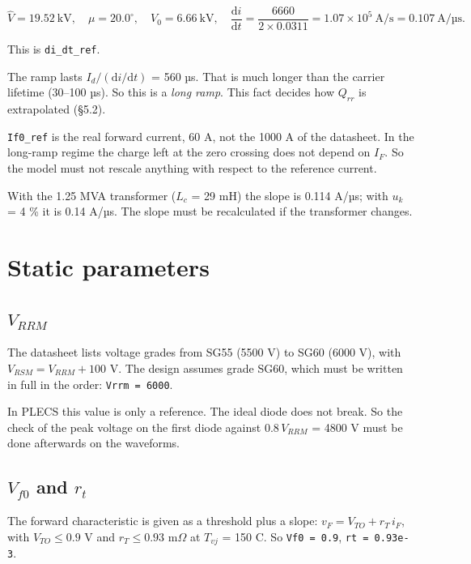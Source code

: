 \documentclass[11pt,a4paper,numbers=noenddot]{scrartcl}
\begin{document}
\begin{onehalfspace}
\[\hat V = 19.52\ \text{kV}, \quad \mu = 20.0^\circ, \quad V_0 = 6.66\ \text{kV}, \quad \frac{\mathrm{d}i}{\mathrm{d}t} = \frac{6660}{2 \times 0.0311} = 1.07 \times 10^5\ \text{A/s} = 0.107\ \text{A/µs}.\]

This is \texttt{di\_dt\_ref}.

The ramp lasts \(I_d/(\mathrm{d}i/\mathrm{d}t)\) = 560 µs. That is much longer than the carrier lifetime (30--100 µs). So this is a \emph{long ramp}. This fact decides how \(Q_{rr}\) is extrapolated (\S5.2).

\texttt{If0\_ref} is the real forward current, 60 A, not the 1000 A of the datasheet. In the long-ramp regime the charge left at the zero crossing does not depend on \(I_F\). So the model must not rescale anything with respect to the reference current.

With the 1.25 MVA transformer (\(L_c\) = 29 mH) the slope is 0.114 A/µs; with \(u_k\) = 4 \% it is 0.14 A/µs. The slope must be recalculated if the transformer changes.

\section{Static parameters}\label{static-parameters}

\subsection{\texorpdfstring{\(V_{RRM}\)}{V\_\{RRM\}}}\label{v_rrm}

The datasheet lists voltage grades from SG55 (5500 V) to SG60 (6000 V), with \(V_{RSM} = V_{RRM} + 100\) V. The design assumes grade SG60, which must be written in full in the order: \texttt{Vrrm\ =\ 6000}.

In PLECS this value is only a reference. The ideal diode does not break. So the check of the peak voltage on the first diode against \(0.8\,V_{RRM}\) = 4800 V must be done afterwards on the waveforms.

\subsection{\texorpdfstring{\(V_{f0}\) and \(r_t\)}{V\_\{f0\} and r\_t}}\label{v_f0-and-r_t}

The forward characteristic is given as a threshold plus a slope: \(v_F = V_{TO} + r_T\, i_F\), with \(V_{TO} \le 0.9\) V and \(r_T \le 0.93\) m\(\Omega\) at \(T_{vj}\) = 150 \textdegree{}C. So \texttt{Vf0\ =\ 0.9}, \texttt{rt\ =\ 0.93e-3}.


\end{onehalfspace}
\end{document}
